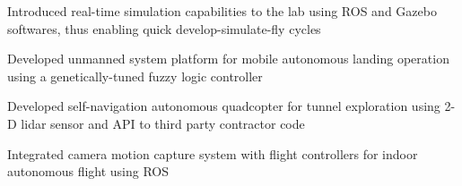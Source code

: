 \documentclass[letterpaper]{deedy-resume}
\newcommand{\experiencespace}{\vspace{2em}}
\begin{document}
\begin{minipage}[t]{0.66\textwidth}
    \begin{compactitem}
        \item Introduced real-time simulation capabilities to the lab using ROS and Gazebo softwares, thus
            enabling quick develop-simulate-fly cycles
        \item Developed unmanned system platform for mobile autonomous landing operation using a
            genetically-tuned fuzzy logic controller
        \item Developed self-navigation autonomous quadcopter for tunnel exploration using 2-D lidar sensor
            and API to third party contractor code
        \item Integrated camera motion capture system with flight controllers for indoor autonomous flight
            using ROS
    \end{compactitem}
    \experiencespace
    


\end{minipage}
\end{document}
